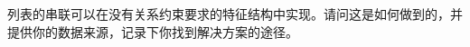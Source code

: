 {\begin{enumerate}

列表的串联可以在没有关系约束要求的特征结构中实现。请问这是如何做到的，并提供你的数据来源，记录下你找到解决方案的途径。

\end{enumerate}
}

